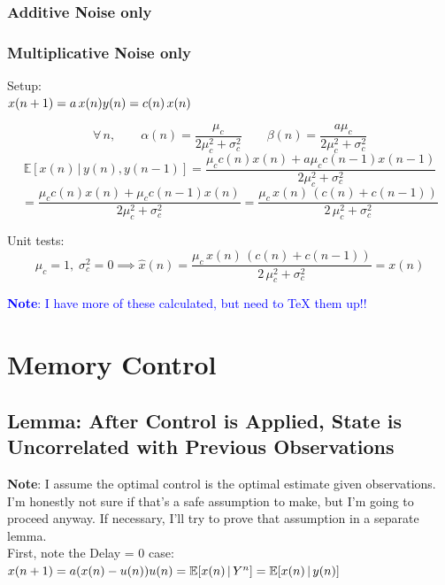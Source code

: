 \documentclass[14pt]{extarticle}
\begin{document}
\subsubsection{Additive Noise only}

\subsubsection{Multiplicative Noise only}
Setup: \\
\begin{math}
x(n+1) = a \, x(n) \\
y(n) = c(n) \, x(n) \\
\end{math}

\[ \forall \, n, \quad \quad \alpha(n) = \frac{\mu_c}{2\mu_c^2 + \sigma_c^2} \quad \quad \beta(n) = \frac{a\mu_c}{2\mu_c^2 + \sigma_c^2} \]
\[ \mathbb{E}[x(n) \, | \, y(n), y(n-1)] = \frac{ \mu_c c(n) x(n) + a \mu_c c(n-1) x(n-1) }{2\mu_c^2 + \sigma_c^2} \]
\[ = \frac{\mu_c c(n) x(n) + \mu_c c(n-1) x(n)}{2\mu_c^2 + \sigma_c^2} = \frac{\mu_c \, x(n) \, ( c(n) + c(n-1))}{2\, \mu_c^2 + \sigma_c^2} \]

Unit tests:
\[ \mu_c = 1, \; \sigma_c^2 = 0 \implies \hat{x}(n) = \frac{\mu_c \, x(n) \, ( c(n) + c(n-1))}{2\, \mu_c^2 + \sigma_c^2} = x(n) \] 

\textcolor{blue}{\textbf{Note}: I have more of these calculated, but need to TeX them up!!}

\setcounter{secnumdepth}{0}

\section{Memory Control}

\subsection{Lemma: After Control is Applied, State is Uncorrelated with Previous Observations}

\textbf{Note}: I assume the optimal control is the optimal estimate given observations. I'm honestly not sure if that's a safe assumption to make, but I'm going to proceed anyway. If necessary, I'll try to prove that assumption in a separate lemma. \\

First, note the Delay = 0 case: \\
\begin{math}
x(n+1) = a(x(n) - u(n)) \\
u(n) = \mathbb{E}[x(n) \, | \, Y^n] = \mathbb{E}[x(n) \, | \, y(n)] \\
\end{math}
\end{document}
